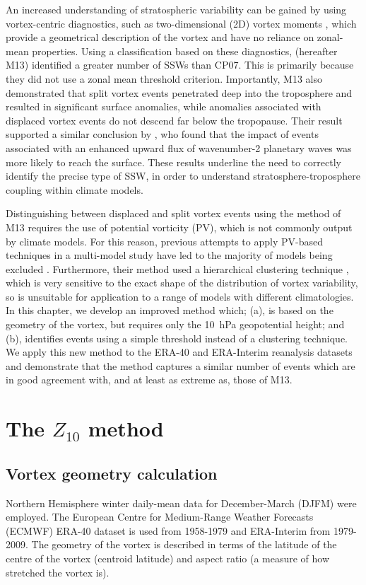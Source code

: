 An increased understanding of stratospheric variability can be gained by using
vortex-centric diagnostics, such as two-dimensional (2D) vortex moments
\citep{Waugh1997, Waugh1999, Mitchell2011, Mitchell2011a}, which provide a
geometrical description of the vortex and have no reliance on zonal-mean
properties. Using a classification based on these diagnostics,
\citet{Mitchell2013} (hereafter M13) identified a greater number of SSWs than
CP07. This is primarily because they did not use a zonal mean threshold
criterion. Importantly, M13 also demonstrated that split vortex events
penetrated deep into the troposphere and resulted in significant surface
anomalies, while anomalies associated with displaced vortex events do not
descend far below the tropopause. Their result supported a similar conclusion by
\citet{Nakagawa2006}, who found that the impact of events associated with an
enhanced upward flux of wavenumber-2 planetary waves was more likely to reach
the surface. These results underline the need to correctly identify the precise
type of SSW, in order to understand stratosphere-troposphere coupling within
climate models.

Distinguishing between displaced and split vortex events using the method of M13
requires the use of potential vorticity (PV), which is not commonly output by
climate models. For this reason, previous attempts to apply PV-based techniques
in a multi-model study have led to the majority of models being excluded
\citep{Mitchell2012a}. Furthermore, their method used a hierarchical clustering
technique \citep{Hannachi2010}, which is very sensitive to the exact shape of
the distribution of vortex variability, so is unsuitable for application to a
range of models with different climatologies. In this chapter, we develop an
improved method which; (a), is based on the geometry of the vortex, but requires
only the 10~hPa geopotential height; and (b), identifies events using a simple
threshold instead of a clustering technique. We apply this new method to the
ERA-40 and ERA-Interim reanalysis datasets and demonstrate that the method
captures a similar number of events which are in good agreement with, and at
least as extreme as, those of M13.


\section{The $Z_{10}$ method}
\subsection{Vortex geometry calculation}
\label{sec:vort-geom-calc}
Northern Hemisphere winter daily-mean data for December-March (DJFM) were
employed. The European Centre for Medium-Range Weather Forecasts (ECMWF) ERA-40
dataset \citep{Uppala2005} is used from 1958-1979 and ERA-Interim
\citep{Dee2011} from 1979-2009. The geometry of the vortex is described in terms
of the latitude of the centre of the vortex (centroid latitude) and aspect ratio
(a measure of how stretched the vortex
is).

